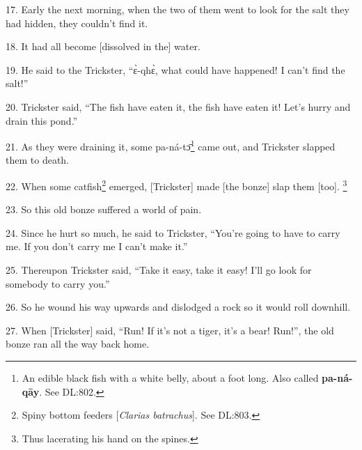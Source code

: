 17. Early the next morning, when the two of them went to look for the salt they
had hidden, they couldn't find it.

18. It had all become [dissolved in the] water.

19. He said to the Trickster, ``ɛ̀-qhɛ̀, what could have happened! I can't
find the salt!''

20. Trickster said, ``The fish have eaten it, the fish have eaten it! Let's hurry
and drain this pond.''

21. As they were draining it, some pa-ná-tɔ̄\footnote{An edible black fish with a white belly, about a foot long. Also called \textbf{pa-ná-qāy}. See DL:802.} came out, and Trickster slapped
them to death.

22. When some catfish\footnote{Spiny bottom feeders [\textit{Clarias batrachus}]. See DL:803.} emerged, [Trickster] made [the bonze] slap them [too].
\footnote{Thus lacerating his hand on the spines.}

23. So this old bonze suffered a world of pain.

24. Since he hurt so much, he said to Trickster, ``You're going to have to carry
me. If you don't carry me I can't make it.''

25. Thereupon Trickster said, ``Take it easy, take it easy! I'll go look for somebody
to carry you.''

26. So he wound his way upwards and dislodged a rock so it would roll downhill.

27. When [Trickster] said, ``Run! If it's not a tiger, it's a bear! Run!'', the
old bonze ran all the way back home.

